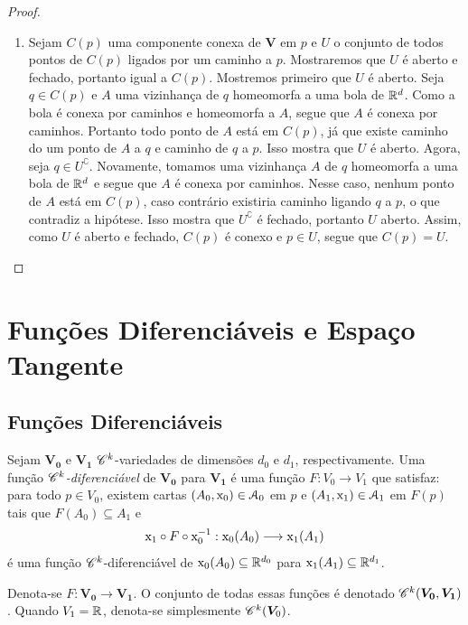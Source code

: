 \begin{proof}
\begin{enumerate}
	\item Sejam $C(p)$ uma componente conexa de $\bm V$ em $p$ e $U$ o conjunto de todos pontos de $C(p)$ ligados por um caminho a $p$. Mostraremos que $U$ é aberto e fechado, portanto igual a $C(p)$. Mostremos primeiro que $U$ é aberto. Seja $q \in C(p)$ e $A$ uma vizinhança de $q$ homeomorfa a uma bola de $\mathbb{R}^d$. Como a bola é conexa por caminhos e homeomorfa a $A$, segue que $A$ é conexa por caminhos. Portanto todo ponto de $A$ está em $C(p)$, já que existe caminho do um ponto de $A$ a $q$ e caminho de $q$ a $p$. Isso mostra que $U$ é aberto. Agora, seja $q \in U^\complement$. Novamente, tomamos uma vizinhança $A$ de $q$ homeomorfa a uma bola de $\mathbb{R}^d$ e segue que $A$ é conexa por caminhos. Nesse caso, nenhum ponto de $A$ está em $C(p)$, caso contrário existiria caminho ligando $q$ a $p$, o que contradiz a hipótese. Isso mostra que $U^\complement$ é fechado, portanto $U$ aberto. Assim, como $U$ é aberto e fechado, $C(p)$ é conexo e $p \in U$, segue que $C(p)=U$.
		\end{enumerate}
\end{proof}

\section{Funções Diferenciáveis e Espaço Tangente}

\subsection{Funções Diferenciáveis}

\begin{defi}
Sejam $\bm{V_0}$ e $\bm{V_1}$ $\mathscr{C}^k$-variedades de dimensões $d_0$ e $d_1$, respectivamente. Uma função \emph{$\mathscr{C}^k$-diferenciável} de $\bm{V_0}$ para $\bm{V_1}$ é uma função
 $F\colon V_0 \to V_1$ que satisfaz: para todo $p \in V_0$, existem cartas $(A_0,\mathrm{x}_0) \in \mathcal{A}_0$ em $p$ e $(A_1,\mathrm{x}_1) \in \mathcal{A}_1$ em $F(p)$ tais que $F(A_0) \subseteq A_1$ e
		\begin{equation*}
		\mathrm{x}_1 \circ F \circ \mathrm{x}_0^{-1}: \mathrm{x}_0(A_0) \longrightarrow \mathrm{x}_1(A_1)
		\end{equation*}
é uma função $\mathscr{C}^k$-diferenciável de $\mathrm{x}_0(A_0) \subseteq \mathbb{R}^{d_0}$ para $\mathrm{x}_1(A_1) \subseteq \mathbb{R}^{d_1}$.

Denota-se $F\colon \bm{V_0} \to \bm{V_1}$. O conjunto de todas essas funções é denotado $\mathscr{C}^k(\bm{V_0},\bm{V_1})$. Quando $V_1=\mathbb{R}$, denota-se simplesmente $\mathscr{C}^k(\bm V_0)$.
\end{defi}

